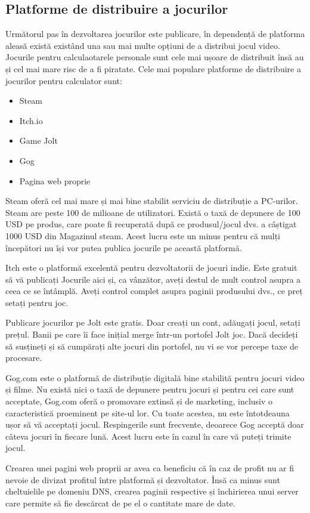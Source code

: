 \subsection{Platforme de distribuire a jocurilor}
\label{section:platforme}
Următorul pas în dezvoltarea jocurilor este publicare, în dependență de platforma aleasă există existând una sau mai multe opțiuni de a distribui jocul video. Jocurile pentru calculaotarele personale sunt cele mai ușoare de distribuit însă au și cel mai mare risc de a fi piratate. Cele mai populare platforme de distribuire a jocurilor pentru calculator sunt:
\begin{itemize}
    \item Steam
    \item Itch.io
    \item Game Jolt
    \item Gog
    \item Pagina web proprie
\end{itemize}

Steam oferă cel mai mare și mai bine stabilit serviciu de distribuție a PC-urilor. Steam are peste 100 de milioane de utilizatori. 
Există o taxă de depunere de 100 USD pe produs, care poate fi recuperată după ce produsul/jocul dvs. a câștigat 1000 USD din Magazinul steam. Acest lucru este un minus pentru că mulți începători nu își vor putea publica jocurile pe această platformă.

Itch este o platformă excelentă pentru dezvoltatorii de jocuri indie. Este gratuit să vă publicați Jocurile aici și, ca vânzător, aveți destul de mult control asupra a ceea ce se întâmplă. Aveți control complet asupra paginii produsului dvs., ce preț setați pentru joc.

Publicare jocurilor pe Jolt este gratis. Doar creați un cont, adăugați jocul, setați prețul. Banii pe care îi face inițial merge într-un portofel Jolt joc. Dacă decideți să susțineți și să cumpărați alte jocuri din portofel, nu vi se vor percepe taxe de procesare.

Gog.com este o platformă de distribuție digitală bine stabilită pentru jocuri video și filme. Nu există nici o taxă de depunere pentru jocuri și pentru cei care sunt acceptate, Gog.com oferă o promovare extinsă și de marketing, inclusiv o caracteristică proeminent pe site-ul lor. Cu toate acestea, nu este întotdeauna ușor să vă acceptați jocul. Respingerile sunt frecvente, deoarece Gog acceptă doar câteva jocuri în fiecare lună.  Acest lucru este în cazul în care vă puteți trimite jocul.

Crearea unei pagini web proprii ar avea ca beneficiu că în caz de profit nu ar fi nevoie de divizat profitul între platformă și dezvoltator. Însă ca minus sunt cheltuielile pe domeniu DNS, crearea paginii respective și închirierea unui server care permite să fie descărcat de pe el o cantitate mare de date.
